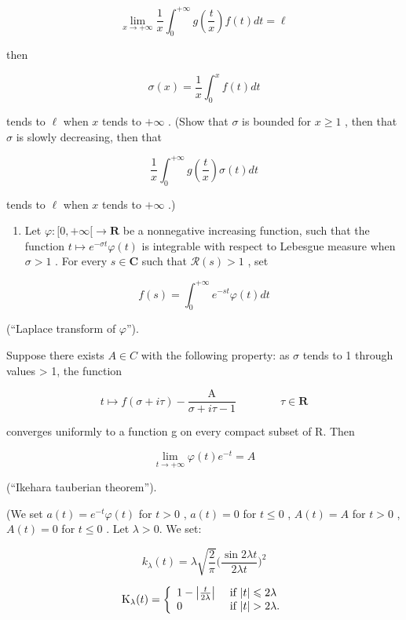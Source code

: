 \[
\lim _ {x \to + \infty} \frac {1}{x} \int_ {0} ^ {+ \infty} g \left(\frac {t}{x}\right) f (t) d t = \ell
\]

then

\[
\sigma (x) = \frac {1}{x} \int_ {0} ^ {x} f (t) d t
\]

tends to \(\ell\) when \(x\) tends to \(+\infty\) . (Show that \(\sigma\) is bounded for \(x \geqslant 1\) , then that \(\sigma\) is slowly decreasing, then that

\[
\frac {1}{x} \int_ {0} ^ {+ \infty} g \left(\frac {t}{x}\right) \sigma (t) d t
\]

tends to \(\ell\) when \(x\) tends to \(+\infty\) .)

\begin{enumerate}
\def\labelenumi{\arabic{enumi})}
\setcounter{enumi}{8}
\tightlist
\item
  Let \(\varphi\colon[0,+\infty[\to\mathbf{R}\) be a nonnegative increasing function, such that the function \(t\mapsto e^{-\sigma t}\varphi(t)\) is integrable with respect to Lebesgue measure when \(\sigma>1\) . For every \(s\in\mathbf{C}\) such that \(\mathcal{R}(s)>1\) , set
\end{enumerate}

\[
f (s) = \int_ {0} ^ {+ \infty} e ^ {- s t} \varphi (t) d t
\]

(“Laplace transform of \(\varphi\)”).

Suppose there exists \(A \in C\) with the following property: as \(\sigma\) tends to 1 through values \textgreater{} 1, the function

\[
t \mapsto f (\sigma + i \tau) - \frac {\mathrm{A}}{\sigma + i \tau - 1} \qquad \qquad \tau \in \mathbf {R}
\]

converges uniformly to a function g on every compact subset of R. Then

\[
\lim _ {t \to + \infty} \varphi (t) e ^ {- t} = A
\]

(“Ikehara tauberian theorem”).

(We set \(a(t) = e^{-t}\varphi(t)\) for \(t > 0\) , \(a(t) = 0\) for \(t \leqslant 0\) , \(A(t) = A\) for \(t > 0\) , \(A(t) = 0\) for \(t \leqslant 0\) . Let \(\lambda > 0\). We set:

\[
k _ {\lambda} (t) = \lambda \sqrt {\frac {2}{\pi}} \Big (\frac {\sin 2 \lambda t}{2 \lambda t} \Big) ^ {2}
\]

\[
\mathrm{K} _ {\lambda} (t) = \left\{ \begin{array}{l l} 1 - \left| \frac {t}{2 \lambda} \right| & \text { if } | t | \leqslant 2 \lambda \\ 0 & \text { if } | t | > 2 \lambda . \end{array} \right.
\]


